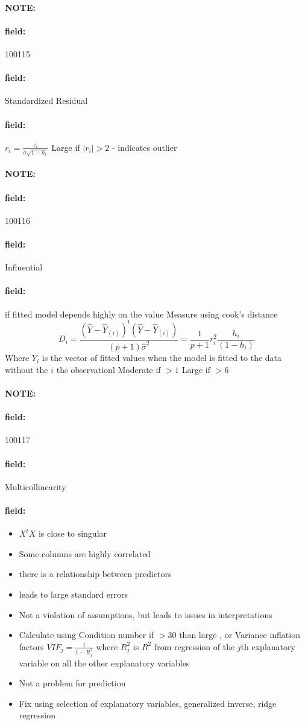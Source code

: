 \documentclass[12pt]{article}
\newenvironment{note}{\paragraph{NOTE:}}{}
\newenvironment{field}{\paragraph{field:}}{}
\begin{document}
\begin{note} \begin{field} \tiny 100115 \end{field}
 \begin{field}
  Standardized Residual
 \end{field}
 \begin{field}
  $r_i = \frac{e_i}{\hat{\sigma}\sqrt{1 - h_i}}$
  Large if $|r_i| > 2$ - indicates outlier
 \end{field}
\end{note}

\begin{note} \begin{field} \tiny 100116 \end{field}
 \begin{field}
  Influential
 \end{field}
 \begin{field}
    if fitted model depends highly on the value
  Measure using cook's distance
  $$ D_i = \frac{(\hat{Y} - \hat{Y}_{(i)})^t(\hat{Y} - \hat{Y}_{(i)})}{(p+1)\hat{\sigma}^2} = \frac{1}{p+1}r_i^2 \frac{h_i}{(1 - h_i)}$$
  Where $Y_{i}$ is the vector of fitted values when the model is fitted to the data without the $i$ ths observationl Moderate if $>1 $ Large if $>6$
 \end{field}
\end{note}


\begin{note} \begin{field} \tiny 100117 \end{field}
 \begin{field}
  Multicollinearity
 \end{field}
 \begin{field}
  \begin{itemize}
   \item $X^tX$ is close to singular
   \item Some columns are highly correlated
   \item there is a relationship between predictors \item leads to large standard errors
   \item Not a violation of assumptions, but leads to issues in interpretations
   \item Calculate using Condition number if $>30$ than large , or Variance inflation factors $VIF_j = \frac{1}{1 - R^2_j}$ where $R^2_j$ is $R^2$ from regression of the $j$th explanatory variable on all the other explanatory variables
   \item Not a problem for prediction
   \item Fix using selection of explanatory variables, generalized inverse, ridge regression
  \end{itemize}
 \end{field}
\end{note}
\end{document}
